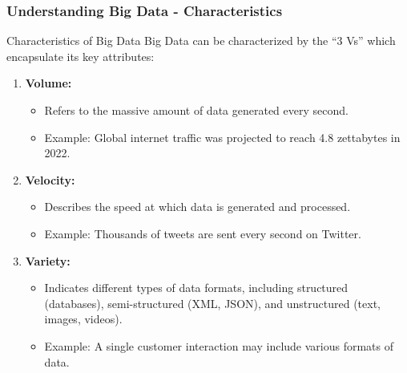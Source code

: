 \documentclass[aspectratio=169]{beamer}
\begin{document}
\begin{frame}[fragile]
    \frametitle{Understanding Big Data - Characteristics}
    \begin{block}{Characteristics of Big Data}
        Big Data can be characterized by the ``3 Vs'' which encapsulate its key attributes:
    \end{block}
    
    \begin{enumerate}
        \item \textbf{Volume:} 
        \begin{itemize}
            \item Refers to the massive amount of data generated every second. 
            \item Example: Global internet traffic was projected to reach 4.8 zettabytes in 2022.
        \end{itemize}

        \item \textbf{Velocity:} 
        \begin{itemize}
            \item Describes the speed at which data is generated and processed. 
            \item Example: Thousands of tweets are sent every second on Twitter.
        \end{itemize}

        \item \textbf{Variety:} 
        \begin{itemize}
            \item Indicates different types of data formats, including structured (databases), semi-structured (XML, JSON), and unstructured (text, images, videos).
            \item Example: A single customer interaction may include various formats of data.
        \end{itemize}
    \end{enumerate}
\end{frame}
\end{document}
